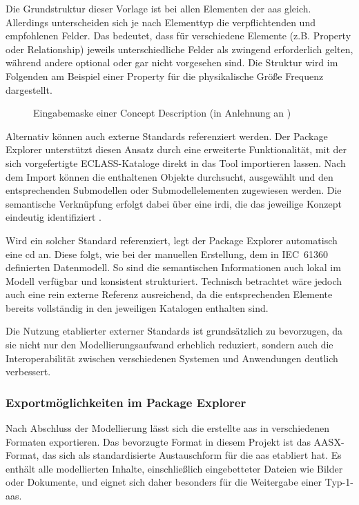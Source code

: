 Die Grundstruktur dieser Vorlage ist bei allen Elementen der \acs{aas} gleich.
Allerdings unterscheiden sich je nach Elementtyp die verpflichtenden und empfohlenen Felder.
Das bedeutet, dass für verschiedene Elemente (z.B. Property oder Relationship) jeweils unterschiedliche Felder als zwingend erforderlich gelten, während andere optional oder gar nicht vorgesehen sind.
Die Struktur wird im Folgenden am Beispiel einer Property für die physikalische Größe Frequenz dargestellt.

\vspace{0.25em}
\begin{figure}[htbp]
    \centering
    
    \vspace{-0.5em}
    \caption[Eingabemaske einer Concept Description]{Eingabemaske einer Concept Description (in Anlehnung an \cite{SpezifikationPart3a})}
    \label{fig:SubmodellTypenschild}
\end{figure}
\vspace{-0.35em}

Alternativ können auch externe Standards referenziert werden. 
Der Package Explorer unterstützt diesen Ansatz durch eine erweiterte Funktionalität, mit der sich vorgefertigte ECLASS-Kataloge direkt in das Tool importieren lassen. 
Nach dem Import können die enthaltenen Objekte durchsucht, ausgewählt und den entsprechenden Submodellen oder Submodellelementen zugewiesen werden. 
Die semantische Verknüpfung erfolgt dabei über eine \acs{irdi}, die das jeweilige Konzept eindeutig identifiziert \cite{eclass_irdi}. 

Wird ein solcher Standard referenziert, legt der Package Explorer automatisch eine \acs{cd} an.
Diese folgt, wie bei der manuellen Erstellung, dem in IEC~61360 definierten Datenmodell.  
So sind die semantischen Informationen auch lokal im Modell verfügbar und konsistent strukturiert.
Technisch betrachtet wäre jedoch auch eine rein externe Referenz ausreichend, da die entsprechenden Elemente bereits vollständig in den jeweiligen Katalogen enthalten sind.

Die Nutzung etablierter externer Standards ist grundsätzlich zu bevorzugen, da sie nicht nur den Modellierungsaufwand erheblich reduziert, sondern auch die Interoperabilität zwischen verschiedenen Systemen und Anwendungen deutlich verbessert.

\subsubsection*{Exportmöglichkeiten im Package Explorer}
\vspace{-0.5em}
Nach Abschluss der Modellierung lässt sich die erstellte \acs{aas} in verschiedenen Formaten exportieren.
Das bevorzugte Format in diesem Projekt ist das AASX-Format, das sich als standardisierte Austauschform für die \acs{aas} etabliert hat.
Es enthält alle modellierten Inhalte, einschließlich eingebetteter Dateien wie Bilder oder Dokumente, und eignet sich daher besonders für die Weitergabe einer Typ-1-\acs{aas}.

